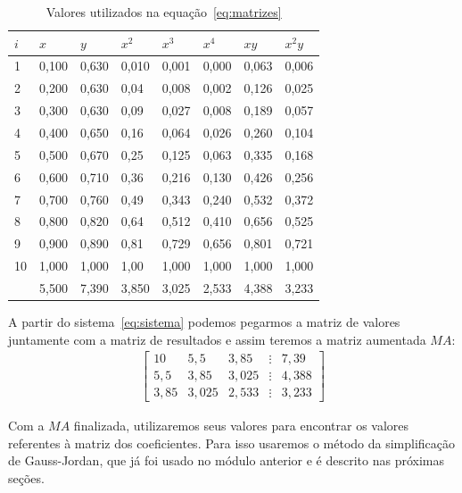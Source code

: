 \documentclass[12pt, hidelinks]{article}
\begin{document}
\begin{table}[!h]
  \centering
  \begin{tabular}{llllllll}
    \hline
    \centering
    $i$ & $x$ & $y$ & $x^2$ & $x^3$ & $x^4$ & $xy$ & $x^2y$\\
    \hline
    1  & 0,100 & 0,630 & 0,010 & 0,001 & 0,000 & 0,063 & 0,006\\
    2  & 0,200 & 0,630 & 0,04  & 0,008 & 0,002 & 0,126 & 0,025\\
    3  & 0,300 & 0,630 & 0,09  & 0,027 & 0,008 & 0,189 & 0,057\\
    4  & 0,400 & 0,650 & 0,16  & 0,064 & 0,026 & 0,260 & 0,104\\
    5  & 0,500 & 0,670 & 0,25  & 0,125 & 0,063 & 0,335 & 0,168\\
    6  & 0,600 & 0,710 & 0,36  & 0,216 & 0,130 & 0,426 & 0,256\\
    7  & 0,700 & 0,760 & 0,49  & 0,343 & 0,240 & 0,532 & 0,372\\
    8  & 0,800 & 0,820 & 0,64  & 0,512 & 0,410 & 0,656 & 0,525\\
    9  & 0,900 & 0,890 & 0,81  & 0,729 & 0,656 & 0,801 & 0,721\\
    10 & 1,000 & 1,000 & 1,00  & 1,000 & 1,000 & 1,000 & 1,000\\
    \hline
       & 5,500 & 7,390 & 3,850 & 3,025 & 2,533 & 4,388 & 3,233\\
    \hline
  \end{tabular}
  \caption{Valores utilizados na equação~\eqref{eq:matrizes}}
\end{table}

\newpage
A partir do sistema~\eqref{eq:sistema} podemos pegarmos a
matriz de valores juntamente com a matriz de resultados e assim teremos a matriz aumentada $MA$:
\begin{eqnarray}\label{eq:ma}
\left[\begin{array}{rrrrr}
  10   & 5,5    & 3,85 & \vdots & 7,39\\
  5,5  & 3,85   & 3,025& \vdots & 4,388\\
  3,85 & 3,025  & 2,533& \vdots & 3,233
\end{array}\right]
\end{eqnarray}

Com a $MA$ finalizada, utilizaremos seus valores para encontrar os valores referentes à matriz dos coeficientes. Para isso usaremos o método da simplificação de Gauss-Jordan, que já foi usado no módulo anterior e é descrito nas próximas seções.
\end{document}
